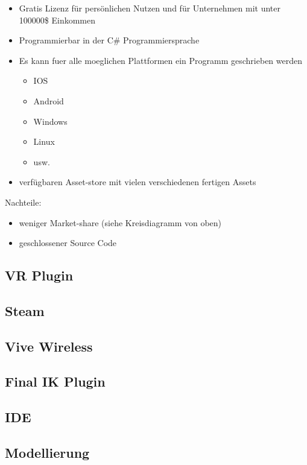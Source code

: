 \begin{itemize}
    \item Gratis Lizenz für persönlichen Nutzen und für Unternehmen mit unter 100000\$ Einkommen
    \item Programmierbar in der C# Programmiersprache
    \item Es kann fuer alle moeglichen Plattformen ein Programm geschrieben werden
    \begin{itemize}
        \item IOS
        \item Android
        \item Windows
        \item Linux
        \item usw.
    \end{itemize}
    \item verfügbaren Asset-store mit vielen verschiedenen fertigen Assets
\end{itemize}

Nachteile:

\begin{itemize}
    \item weniger Market-share (siehe Kreisdiagramm von oben)
    \item geschlossener Source Code
\end{itemize}

\subsection{VR Plugin}
\lipsum[5-12]

\subsection{Steam}
\lipsum[5-12]

\subsection{Vive Wireless}
\lipsum[5-12]

\subsection{Final IK Plugin}
\lipsum[5-12]

\subsection{IDE}
\lipsum[5-12]

\subsection{Modellierung}
\lipsum[5-12]
